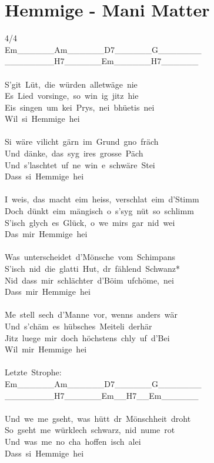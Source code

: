 \documentclass[]{book}
\let\stdsection\section
\renewcommand\section{\clearpage\stdsection}
\begin{document}
\hypertarget{hemmige---mani-matter}{%
\section{Hemmige - Mani Matter}\label{hemmige---mani-matter}}

4/4\\
\textbar Em\_\_\_\_\_\_\textbar Am\_\_\_\_\_\_\textbar D7\_\_\_\_\_\_\textbar G\_\_\_\_\_\_\_\textbar{}\\
\textbar\_\_\_\_\_\_\_\_\textbar H7\_\_\_\_\_\_\textbar Em\_\_\_\_\_\_\textbar H7\_\_\_\_\_\_\textbar{}\\
~\\
S'git~Lüt,~die~würden~alletwäge~nie\\
Es~Lied~vorsinge,~so~win~ig~jitz~hie\\
Eis~singen~um~kei~Prys,~nei~bhüetis~nei\\
Wil~si~Hemmige~hei\\
~\\
Si~wäre~vilicht~gärn~im~Grund~gno~fräch\\
Und~dänke,~das~syg~ires~grosse~Päch\\
Und~s'laschtet~uf~ne~win~e~schwäre~Stei\\
Dass~si~Hemmige~hei\\
~\\
I~weis,~das~macht~eim~heiss,~verschlat~eim~d'Stimm\\
Doch~dünkt~eim~mängisch~o~s'syg~nüt~so~schlimm\\
S'isch~glych~es~Glück,~o~we~mirs~gar~nid~wei\\
Das~mir~Hemmige~hei\\
~\\
Was~unterscheidet~d'Mönsche~vom~Schimpans\\
S'isch~nid~die~glatti~Hut,~dr~fählend~Schwanz*\\
Nid~dass~mir~schlächter~d'Böim~ufchöme,~nei\\
Dass~mir~Hemmige~hei\\
~\\
Me~stell~sech~d'Manne~vor,~wenns~anders~wär\\
Und~s'chäm~es~hübsches~Meiteli~derhär\\
Jitz~luege~mir~doch~höchstens~chly~uf~d'Bei\\
Wil~mir~Hemmige~hei\\
~\\
Letzte~Strophe:\\
\textbar Em\_\_\_\_\_\_\textbar Am\_\_\_\_\_\_\textbar D7\_\_\_\_\_\_\textbar G\_\_\_\_\_\_\_\textbar{}\\
\textbar\_\_\_\_\_\_\_\_\textbar H7\_\_\_\_\_\_\textbar Em\_\_H7\_\_\textbar Em\_\_\_\_\_\_\textbar~\\
~\\
Und~we~me~gseht,~was~hütt~dr~Mönschheit~droht\\
So~gseht~me~würklech~schwarz,~nid~nume~rot\\
Und~was~me~no~cha~hoffen~isch~alei\\
Dass~si~Hemmige~hei\\
~\\
\end{document}
